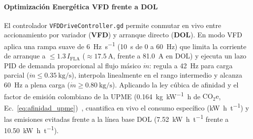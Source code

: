 \paragraph*{Optimización Energética VFD frente a DOL}
El controlador \texttt{VFDDrive\allowbreak Controller.gd} permite conmutar en vivo entre accionamiento por variador (\textbf{VFD}) y arranque directo (\textbf{DOL}). En modo VFD aplica una rampa suave de \qty{6}{\hertz\per\second} (\qty{10}{\second} de $0$ a \qty{60}{\hertz}) que limita la corriente de arranque a $\le 1.3\,I_{\text{FLA}}$ ($\approx\qty{17.5}{\ampere}$, frente a \qty{81.0}{\ampere} en DOL) y ejecuta un lazo PID de demanda proporcional al flujo másico $\dot{m}$: regula a \qty{42}{\hertz} para carga parcial ($\dot{m}\le\qty{0.35}{\kilogram\per\second}$), interpola linealmente en el rango intermedio y alcanza \qty{60}{\hertz} a plena carga ($\dot{m}\ge\qty{0.80}{\kilogram\per\second}$). Aplicando la ley cúbica de afinidad y el factor de emisión colombiano de la UPME (\qty{0.164}{\kilogram\per\kilo\watt\hour} de $\text{CO}_2\text{e}$, Ec.~\eqref{eq:afinidad_upme})~\cite{UPME2024,Resa2019}, cuantifica en vivo el consumo específico (\unit{\kilo\watt\hour\per\tonne}) y las emisiones evitadas frente a la línea base DOL (\qty{7.52}{\kilo\watt\hour\per\tonne} frente a \qty{10.50}{\kilo\watt\hour\per\tonne}).

